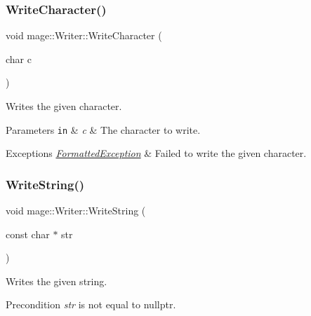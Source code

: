 \hypertarget{classmage_1_1_writer_aa1ef04f5e69c44afda56704c2823316c}{}\label{classmage_1_1_writer_aa1ef04f5e69c44afda56704c2823316c} 
\subsubsection{\texorpdfstring{Write\+Character()}{WriteCharacter()}}
{\footnotesize\ttfamily void mage\+::\+Writer\+::\+Write\+Character (\begin{DoxyParamCaption}\item[{char}]{c }\end{DoxyParamCaption})\hspace{0.3cm}{\ttfamily [protected]}}

Writes the given character.


\begin{DoxyParams}[1]{Parameters}
\mbox{\tt in}  & {\em c} & The character to write. \\
\hline
\end{DoxyParams}

\begin{DoxyExceptions}{Exceptions}
{\em \hyperlink{structmage_1_1_formatted_exception}{Formatted\+Exception}} & Failed to write the given character. \\
\hline
\end{DoxyExceptions}
\hypertarget{classmage_1_1_writer_abffb25b71fc692db26abfa9dd147874e}{}\label{classmage_1_1_writer_abffb25b71fc692db26abfa9dd147874e} 
\subsubsection{\texorpdfstring{Write\+String()}{WriteString()}\hspace{0.1cm}{\footnotesize\ttfamily [1/2]}}
{\footnotesize\ttfamily void mage\+::\+Writer\+::\+Write\+String (\begin{DoxyParamCaption}\item[{const char $\ast$}]{str }\end{DoxyParamCaption})\hspace{0.3cm}{\ttfamily [protected]}}

Writes the given string.

\begin{DoxyPrecond}{Precondition}
{\itshape str} is not equal to {\ttfamily nullptr}. 
\end{DoxyPrecond}

